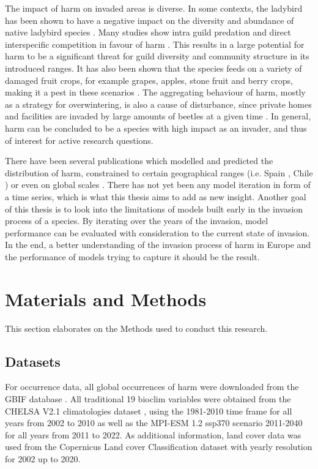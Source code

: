 \documentclass[12pt,a4paper]{article}
\begin{document}
The impact of \gls{harm} on invaded areas is diverse.
In some contexts, the ladybird has been shown to have a negative impact on the diversity and abundance of native ladybird species \autocite{roy2016harmonia}.
Many studies show intra guild predation and direct interspecific competition in favour of \gls{harm} \autocite{pell2008harmoniaIGP}.
This results in a large potential for \gls{harm} to be a significant threat for guild diversity and community structure in its introduced ranges.
It has also been shown that the species feeds on a variety of damaged fruit crops, for example grapes, apples, stone fruit and berry crops, making it a pest in these scenarios \autocite{koch2004harmoniafoodcrop}.
The aggregating behaviour of \gls{harm}, mostly as a strategy for overwintering, is also a cause of disturbance, since private homes and facilities are invaded by large amounts of beetles at a given time \autocite{nalepa2005harmoniahomes}.
In general, \gls{harm} can be concluded to be a species with high impact as an invader, and thus of interest for active research questions.

There have been several publications which modelled and predicted the distribution of \gls{harm}, constrained to certain geographical ranges (i.e. Spain \autocite{ameixa2019harmSDMSpain}, Chile \autocite{alaniz2018harmSDMChile}) or even on global scales \autocite{bidinger2012harmSDMglobalMaxent, poutsma2008harmSDMglobalClimex}.
There has not yet been any model iteration in form of a time series, which is what this thesis aims to add as new insight.
Another goal of this thesis is to look into the limitations of models built early in the invasion process of a species.
By iterating over the years of the invasion, model performance can be evaluated with consideration to the current state of invasion.
In the end, a better understanding of the invasion process of \gls{harm} in Europe and the performance of models trying to capture it should be the result.



\newpage
\section{Materials and Methods} \label{sec:materialsandmethods}
This section elaborates on the Methods used to conduct this research.

\subsection{Datasets} \label{ssec:datasets}
For occurrence data, all global occurrences of \gls{harm} were downloaded from the GBIF database \autocite{GBIFaxyridisdataset}.
All traditional 19 bioclim variables were obtained from the CHELSA V2.1 climatologies dataset \autocite{karger2017CHELSApaper, CHELSAbioclimdataset}, using the 1981-2010 time frame for all years from 2002 to 2010 as well as the MPI-ESM 1.2 ssp370 scenario 2011-2040 for all years from 2011 to 2022.
As additional information, land cover data was used from the Copernicus Land cover Classification dataset \autocite{COPlandcoverdataset}  with yearly resolution for 2002 up to 2020.
\end{document}

